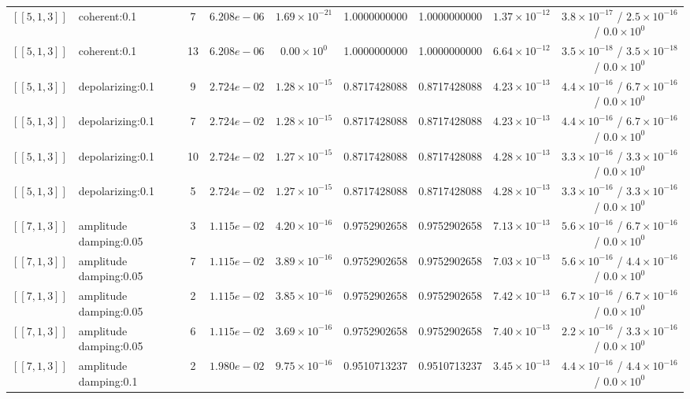 \documentclass[10pt,a4paper]{article}
\begin{document}
\begin{longtable}{llccccccc}
$[\![5,1,3]\!]$ & coherent:0.1 & 7 & $6.208e-06$ & $1.69\times 10^{-21}$ & 1.0000000000 & 1.0000000000 & $1.37\times 10^{-12}$ & $3.8\times 10^{-17}$ / $2.5\times 10^{-16}$ / $0.0\times 10^{0}$ \\
$[\![5,1,3]\!]$ & coherent:0.1 & 13 & $6.208e-06$ & $0.00\times 10^{0}$ & 1.0000000000 & 1.0000000000 & $6.64\times 10^{-12}$ & $3.5\times 10^{-18}$ / $3.5\times 10^{-18}$ / $0.0\times 10^{0}$ \\
$[\![5,1,3]\!]$ & depolarizing:0.1 & 9 & $2.724e-02$ & $1.28\times 10^{-15}$ & 0.8717428088 & 0.8717428088 & $4.23\times 10^{-13}$ & $4.4\times 10^{-16}$ / $6.7\times 10^{-16}$ / $0.0\times 10^{0}$ \\
$[\![5,1,3]\!]$ & depolarizing:0.1 & 7 & $2.724e-02$ & $1.28\times 10^{-15}$ & 0.8717428088 & 0.8717428088 & $4.23\times 10^{-13}$ & $4.4\times 10^{-16}$ / $6.7\times 10^{-16}$ / $0.0\times 10^{0}$ \\
$[\![5,1,3]\!]$ & depolarizing:0.1 & 10 & $2.724e-02$ & $1.27\times 10^{-15}$ & 0.8717428088 & 0.8717428088 & $4.28\times 10^{-13}$ & $3.3\times 10^{-16}$ / $3.3\times 10^{-16}$ / $0.0\times 10^{0}$ \\
$[\![5,1,3]\!]$ & depolarizing:0.1 & 5 & $2.724e-02$ & $1.27\times 10^{-15}$ & 0.8717428088 & 0.8717428088 & $4.28\times 10^{-13}$ & $3.3\times 10^{-16}$ / $3.3\times 10^{-16}$ / $0.0\times 10^{0}$ \\
$[\![7,1,3]\!]$ & amplitude damping:0.05 & 3 & $1.115e-02$ & $4.20\times 10^{-16}$ & 0.9752902658 & 0.9752902658 & $7.13\times 10^{-13}$ & $5.6\times 10^{-16}$ / $6.7\times 10^{-16}$ / $0.0\times 10^{0}$ \\
$[\![7,1,3]\!]$ & amplitude damping:0.05 & 7 & $1.115e-02$ & $3.89\times 10^{-16}$ & 0.9752902658 & 0.9752902658 & $7.03\times 10^{-13}$ & $5.6\times 10^{-16}$ / $4.4\times 10^{-16}$ / $0.0\times 10^{0}$ \\
$[\![7,1,3]\!]$ & amplitude damping:0.05 & 2 & $1.115e-02$ & $3.85\times 10^{-16}$ & 0.9752902658 & 0.9752902658 & $7.42\times 10^{-13}$ & $6.7\times 10^{-16}$ / $6.7\times 10^{-16}$ / $0.0\times 10^{0}$ \\
$[\![7,1,3]\!]$ & amplitude damping:0.05 & 6 & $1.115e-02$ & $3.69\times 10^{-16}$ & 0.9752902658 & 0.9752902658 & $7.40\times 10^{-13}$ & $2.2\times 10^{-16}$ / $3.3\times 10^{-16}$ / $0.0\times 10^{0}$ \\
$[\![7,1,3]\!]$ & amplitude damping:0.1 & 2 & $1.980e-02$ & $9.75\times 10^{-16}$ & 0.9510713237 & 0.9510713237 & $3.45\times 10^{-13}$ & $4.4\times 10^{-16}$ / $4.4\times 10^{-16}$ / $0.0\times 10^{0}$ \\

\end{longtable}
\end{document}

